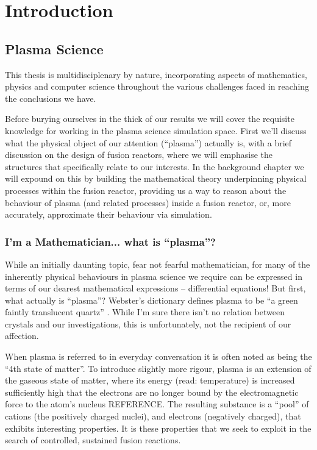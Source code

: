 
\chapter{Introduction}
\label{chapter1}

\section{Plasma Science}

This thesis is multidisciplenary by nature, incorporating aspects of mathematics, physics and computer science throughout 
the various challenges faced in reaching the conclusions we have. 


Before burying ourselves in the thick of our results we 
will cover the requisite knowledge for working in the plasma science simulation space. First we'll discuss what 
the physical object of our attention (``plasma'') actually is, with a brief discussion on the design of fusion reactors, where we will 
emphasise the structures that specifically relate to our interests. In the background chapter we will expound on this by 
building the mathematical theory underpinning physical processes within the fusion reactor, providing us a way to reason
about the behaviour of plasma (and related processes) inside a fusion reactor, or, more accurately, approximate their behaviour 
via simulation.




\subsection{I'm a Mathematician... what is ``plasma''?}

While an initially daunting topic, fear not fearful mathematician, for many of the inherently physical 
behaviours in plasma science we require can be expressed in terms of our dearest mathematical expressions -- differential equations! 
But first, what actually is ``plasma''? Webster's dictionary defines plasma to be ``a green faintly translucent quartz'' \cite{websters_plasma}. 
While I'm sure there isn't no relation between crystals and our investigations, this is unfortunately, not the recipient of our affection. 

When plasma is referred to in everyday conversation it is often noted as being the ``4th state of matter''. To introduce slightly more rigour,
plasma is an extension of the gaseous state of matter, where its energy (read: temperature) is increased sufficiently high that the electrons 
are no longer bound by the electromagnetic force to the atom's nucleus REFERENCE. The resulting substance is a ``pool'' of cations (the positively charged nuclei), and 
electrons (negatively charged), that exhibits interesting properties. It is these properties that we seek to exploit in the search of controlled, 
sustained fusion reactions.

